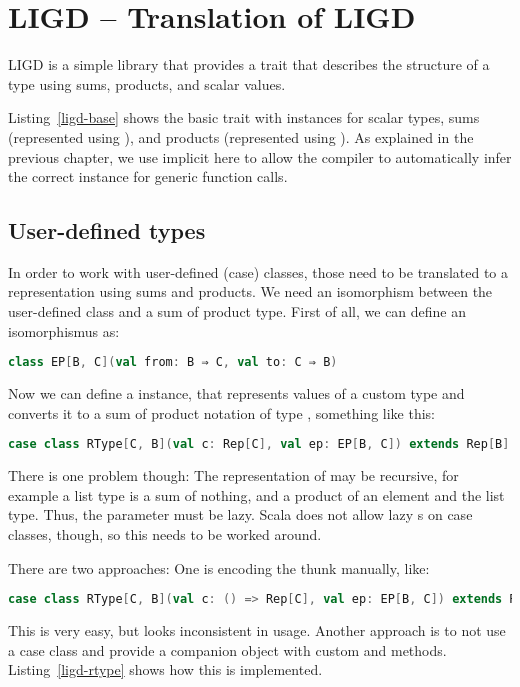 \section{LIGD -- Translation of LIGD}


LIGD is a simple library that provides a  trait that describes
the structure of a type using sums, products, and scalar values.

Listing~\ref{ligd-base} shows the basic  trait with instances for
scalar types, sums (represented using ), and products (represented
using ). As explained in the previous chapter, we use implicit
here to allow the compiler to automatically infer the correct 
instance for generic function calls.


\subsection{User-defined types}
In order to work with user-defined (case) classes, those need to be
translated to a representation using sums and products. We need an
isomorphism between the user-defined class and a sum of product type. First
of all, we can define an isomorphismus as:
\begin{lstlisting}[language=scala,gobble=2]
  class EP[B, C](val from: B ⇒ C, val to: C ⇒ B)
\end{lstlisting}
Now we can define a  instance, that represents values of a custom
type  and converts it to a sum of product notation of type ,
something like this:
\begin{lstlisting}[language=scala,gobble=2]
  case class RType[C, B](val c: Rep[C], val ep: EP[B, C]) extends Rep[B]
\end{lstlisting}
There is one problem though: The representation of  may be recursive,
for example a list type is a sum of nothing, and a product of an element and
the list type. Thus, the parameter  must be lazy. Scala does not allow
lazy s on case classes, though, so this needs to be worked around.

There are two approaches: One is encoding the thunk manually, like:
\begin{lstlisting}[language=scala,gobble=2]
  case class RType[C, B](val c: () => Rep[C], val ep: EP[B, C]) extends Rep[B]
\end{lstlisting}
This is very easy, but looks inconsistent in usage. Another approach is to
not use a case class and provide a companion object with custom 
and  methods. Listing~\ref{ligd-rtype} shows how this is
implemented.


